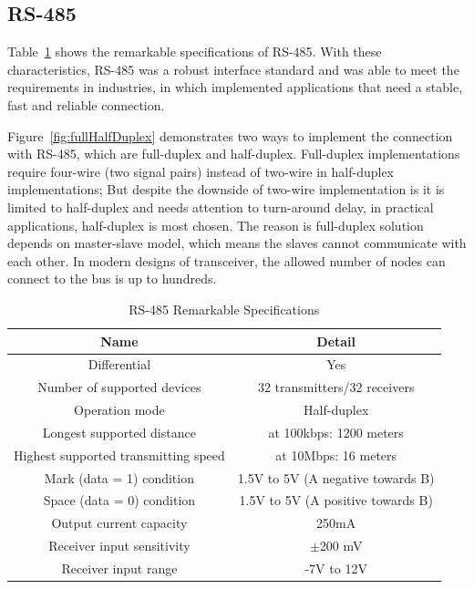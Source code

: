   \subsection{RS-485}
  Table~\ref{table:RS-485HighLightSpecs} shows the remarkable specifications of RS-485. With these characteristics, RS-485 was a robust interface standard and was able to meet the requirements in industries, in which implemented applications that need a stable, fast and reliable connection. 
  
  Figure~\ref{fig:fullHalfDuplex} demonstrates two ways to implement the connection with RS-485, which are full-duplex and half-duplex. Full-duplex implementations require four-wire (two signal pairs) instead of two-wire in half-duplex implementations; But despite the downside of two-wire implementation is it is limited to half-duplex and needs attention to turn-around delay, in practical applications, half-duplex is most chosen. The reason is full-duplex solution depends on master-slave model, which means the slaves cannot communicate with each other. In modern designs of transceiver, the allowed number of nodes can connect to the bus is up to hundreds.
    \begin{table}[h!]
      \begin{center}
      \begin{tabular}{ |c||c|  }
        \hline
        Name & Detail\\
        \hline
        Differential&   Yes\\
        Number of supported devices&   32 transmitters/32 receivers\\
        Operation mode & Half-duplex\\
        Longest supported distance & at 100kbps: 1200 meters\\
        Highest supported transmitting speed& at 10Mbps: 16 meters\\
        Mark (data = 1) condition& 1.5V to 5V (A negative towards B)\\
        Space (data = 0) condition& 1.5V to 5V (A positive towards B)\\
        Output current capacity& 250mA\\
        Receiver input sensitivity& $\pm$200 mV\\
        Receiver input range& -7V to 12V\\        
        \hline
       \end{tabular}
       \caption{RS-485 Remarkable Specifications}
       \label{table:RS-485HighLightSpecs}
      \end{center}
      \end{table}
    
